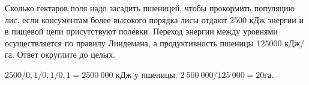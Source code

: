 
Сколько
гектаров поля надо засадить пшеницей, чтобы прокормить популяцию лис, если
консументам более высокого порядка лисы отдают 2500 кДж энергии и в пищевой
цепи присутствуют полёвки. Переход энергии между уровнями осуществляется по
правилу Линдемана, а продуктивность пшеницы 125000 кДж/га. Ответ округлите до
целых.

\solutionSection

$2500/0,1/0,1/0,1=2 500~000$ кДж у пшеницы. $2~500~000/125~000=20$га.

